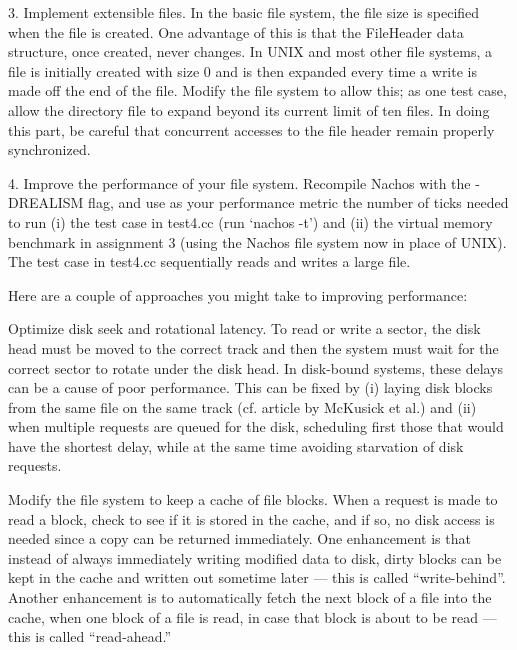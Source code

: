 \begin{description}
\item{3.}
Implement extensible files.  In the basic file system, the file
size is specified when the file is created.  One advantage of this
is that the FileHeader data structure, once created, never changes.
In UNIX and most other file systems, a file is initially created
with size 0 and is then expanded every time a write is made off the
end of the file.  Modify the file system to allow this; as one test
case, allow the directory file to expand beyond its current limit
of ten files.  In doing this part, be careful that concurrent 
accesses to the file header remain properly synchronized.

\item{4.}
Improve the performance of your file system.  
Recompile Nachos with the -DREALISM flag, and use as your
performance metric the number of ticks needed to run (i) 
the test case in test4.cc (run `nachos -t') and (ii)
the virtual memory benchmark in assignment 3 (using the Nachos
file system now in place of UNIX).  The test case in test4.cc
sequentially reads and writes a large file.

Here are a couple of approaches you might take to improving performance:

\begin{description}

\item Optimize disk seek and rotational latency.  To read or write
a sector, the disk head must be moved to the correct track
and then the system must wait for the correct sector to rotate
under the disk head.  In disk-bound systems, these delays can
be a cause of poor performance.  This can be fixed by (i)
laying disk blocks from the same file on the same track 
(cf. article by McKusick et al.) and (ii)
when multiple requests are queued for the disk, scheduling first
those that would have the shortest delay, while at the same
time avoiding starvation of disk requests.

\item Modify the file system to keep a cache of file blocks.  
When a request is made to read a block, check to see if it is stored 
in the cache, and 
if so, no disk access is needed since a copy can be returned immediately.
One enhancement is that instead of always immediately writing modified 
data to disk, dirty blocks can be kept in the cache and written out 
sometime later --- this is called ``write-behind''.
Another enhancement is to
automatically fetch the next block of a file into the cache, when one 
block of a file is read, in case that block is about to be read ---
this is called ``read-ahead.''


\end{description}
\end{description}
